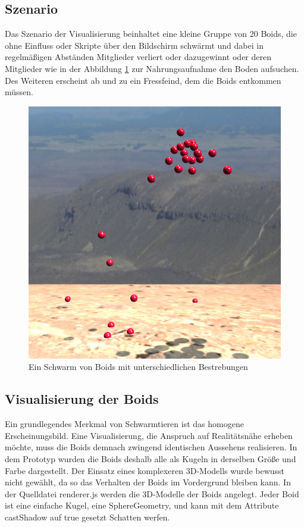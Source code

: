 \documentclass[draft=false
              ,paper=a4
              ,twoside=false
              ,fontsize=11pt
              ,headsepline
              ,BCOR10mm
              ,DIV11
              ,bibtotoc
              ,liststotoc
              ]{scrbook}
\begin{document}
\subsection{Szenario}
Das Szenario der Visualisierung beinhaltet eine kleine Gruppe von 20 Boids, die ohne Einfluss oder Skripte über den Bildschirm schwärmt und dabei in regelmäßigen Abständen Mitglieder verliert oder dazugewinnt oder deren Mitglieder wie in der Abbildung \ref{swarming} zur Nahrungsaufnahme den Boden aufsuchen. Des Weiteren erscheint ab und zu ein Fressfeind, dem die Boids entkommen müssen.

\begin{figure}[!h]
\centering
\includegraphics[scale=0.4]{project/upheaval.png}
\caption{Ein Schwarm von Boids mit unterschiedlichen Bestrebungen}
\label{swarming}
\end{figure}

\subsection{Visualisierung der Boids}
Ein grundlegendes Merkmal von Schwarmtieren ist das homogene Erscheinungsbild. Eine Visualisierung, die Anspruch auf Realitätsnähe erheben möchte, muss die Boids demnach zwingend identischen Aussehens realisieren. In dem Prototyp wurden die Boids deshalb alle als Kugeln in derselben Größe und Farbe dargestellt. Der Einsatz eines komplexeren 3D-Modells wurde bewusst nicht gewählt, da so das Verhalten der Boids im Vordergrund bleiben kann. In der Quelldatei renderer.js werden die 3D-Modelle der Boids angelegt. Jeder Boid ist eine einfache Kugel, eine SphereGeometry, und kann mit dem Attribute castShadow auf true gesetzt Schatten werfen.
\end{document}
